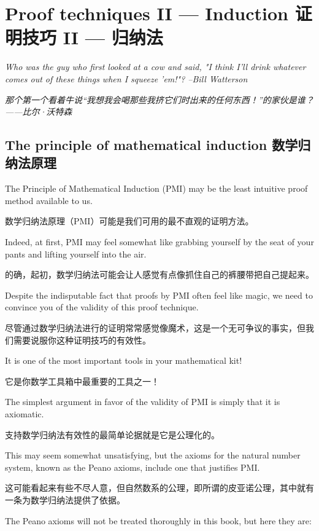 \chapter{Proof techniques II --- Induction 证明技巧 II --- 归纳法}
\label{ch:proof2}

{\em Who was the guy who first looked at a cow and said, "I think I'll drink whatever comes out of these things when I squeeze 'em!"? --Bill Watterson}

{\em 那个第一个看着牛说“我想我会喝那些我挤它们时出来的任何东西！”的家伙是谁？——比尔·沃特森}

\section{The principle of mathematical induction 数学归纳法原理}
\label{sec:induct}

The Principle of Mathematical Induction (PMI) may be the least intuitive
proof method available to us.

数学归纳法原理（PMI）可能是我们可用的最不直观的证明方法。

Indeed, at first, PMI may feel somewhat like
grabbing yourself by the seat of your pants and lifting yourself into
the air.

的确，起初，数学归纳法可能会让人感觉有点像抓住自己的裤腰带把自己提起来。

Despite the indisputable fact that proofs by PMI often feel
like magic, we need to convince you of the validity of this proof
technique.

尽管通过数学归纳法进行的证明常常感觉像魔术，这是一个无可争议的事实，但我们需要说服你这种证明技巧的有效性。

It is one of the most important tools in your mathematical
kit!

它是你数学工具箱中最重要的工具之一！

The simplest argument in favor of the validity of PMI is simply that it is
axiomatic.

支持数学归纳法有效性的最简单论据就是它是公理化的。

This may seem somewhat unsatisfying, but the axioms for
the natural number system, known as the Peano axioms,
include one that justifies PMI.

这可能看起来有些不尽人意，但自然数系的公理，即所谓的皮亚诺公理，其中就有一条为数学归纳法提供了依据。

The Peano axioms will not be treated 
thoroughly in this book, but here they are:

